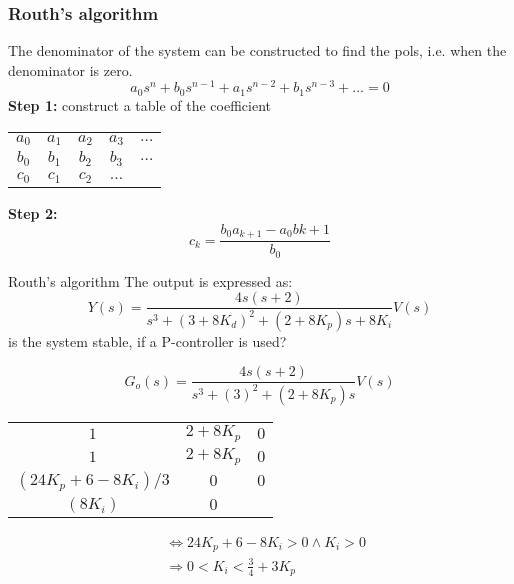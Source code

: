 \subsubsection{Routh's algorithm}
The denominator of the system can be constructed to find the pols, i.e. when the denominator 
is zero.
\begin{equation*}
   a_0s^{n} + b_0s^{n-1} + a_1s^{n-2} + b_1s^{n-3} + \ldots = 0
\end{equation*}
\textbf{Step 1:} construct a table of the coefficient
\begin{center}
    \begin{tabular}{ c c c c c }
     $a_0$ & $a_1$ & $a_2$ & $a_3$ & $\ldots$ \\ 
     $b_0$ & $b_1$ & $b_2$ & $b_3$ & $\ldots$ \\ 
     $c_0$ & $c_1$ & $c_2$ & $\ldots$ & \\ 
    \end{tabular}
\end{center}

\textbf{Step 2:}
\begin{equation*}
    c_k = \frac{b_0a_{k+1} - a_0b{k+1}}{b_0}
\end{equation*}

\begin{exampleblock}{Routh's algorithm}
    The output is expressed as:
    \begin{equation*}
        Y(s) = \frac{4s(s+2)}{s^3+(3+8K_d)^2+(2+8K_p)s+8K_i}V(s)
    \end{equation*}
    is the system stable, if a P-controller is used?

    \begin{equation*}
        G_o(s) = \frac{4s(s+2)}{s^3+(3)^2+(2+8K_p)s}V(s)
    \end{equation*}

    \begin{center}
    \begin{tabular}{ c c c }
     $1$ & $2+8K_p$ & $0$ \\ 
     $1$ & $2+8K_p$ & $0$ \\ 
     $(24K_p+6-8K_i)/3$ & $0$ & $0$ \\
     $(8K_i)$ & $0$ &  \\
    \end{tabular}
    \end{center}

    \begin{align*}
        &\Leftrightarrow 24K_p + 6 - 8K_i > 0 \land K_i > 0 \\
        &\Rightarrow 0 < K_i < \frac{3}{4} + 3K_p
    \end{align*}
\end{exampleblock}


